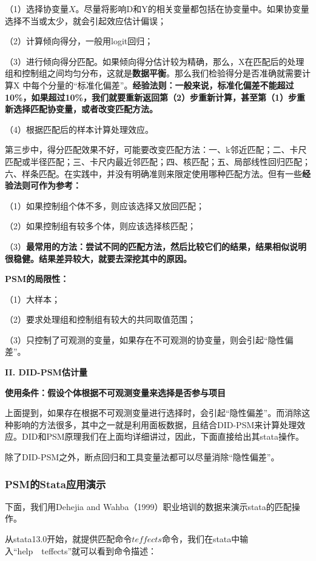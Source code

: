 \documentclass[cn,12pt,math=newtx,citestyle=gb7714-2015,bibstyle=gb7714-2015]{elegantbook}
\begin{document}
	（1）选择协变量$X$。尽量将影响D和Y的相关变量都包括在协变量中。如果协变量选择不当或太少，就会引起效应估计偏误；
	
	（2）计算倾向得分，一般用logit回归；
	
	（3）进行倾向得分匹配。如果倾向得分估计较为精确，那么，X在匹配后的处理组和控制组之间均匀分布，这就是\textbf{数据平衡}。那么我们检验得分是否准确就需要计算X 中每个分量的“标准化偏差”。\textbf{经验法则：一般来说，标准化偏差不能超过10\%，如果超过10\%，我们就要重新返回第（2）步重新计算，甚至第（1）步重新选择匹配协变量，或者改变匹配方法。}
	
	（4）根据匹配后的样本计算处理效应。
	
	第三步中，得分匹配效果不好，可能要改变匹配方法：一、k邻近匹配；二、卡尺匹配或半径匹配；三、卡尺内最近邻匹配；四、核匹配；五、局部线性回归匹配；六、样条匹配。在实践中，并没有明确准则来限定使用哪种匹配方法。但有一些\textbf{经验法则可作为参考：}
	
	（1）如果控制组个体不多，则应该选择又放回匹配；
	
	（2）如果控制组有较多个体，则应该选择核匹配；
	
	（3）\textbf{最常用的方法：尝试不同的匹配方法，然后比较它们的结果，结果相似说明很稳健。结果差异较大，就要去深挖其中的原因。}
	
	\textbf{PSM的局限性：}
	
	（1）大样本；
	
	（2）要求处理组和控制组有较大的共同取值范围；
	
	（3）只控制了可观测的变量，如果存在不可观测的协变量，则会引起“隐性偏差”。
	
	
	
	\textbf{II. DID-PSM估计量}
	
	\textbf{使用条件：假设个体根据不可观测变量来选择是否参与项目}
	
	上面提到，如果存在根据不可观测变量进行选择时，会引起“隐性偏差”。而消除这种影响的方法很多，其中之一就是利用面板数据，且结合DID-PSM来计算处理效应。DID和PSM原理我们在上面均详细讲过，因此，下面直接给出其stata操作。
	
	除了DID-PSM之外，断点回归和工具变量法都可以尽量消除“隐性偏差”。
	
	\subsubsection{PSM的Stata应用演示}
	
	下面，我们用Dehejia and Wahba（1999）职业培训的数据来演示stata的匹配操作。
	
	从stata13.0开始，就提供匹配命令$teffects$命令，我们在stata中输入“help~~teffects”就可以看到命令描述：
	
\end{document}
